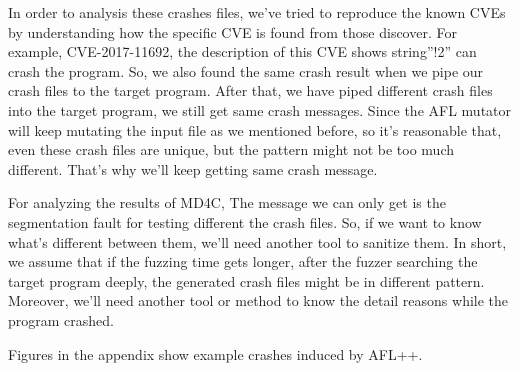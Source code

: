 \documentclass[12pt]{diazessay}
\begin{document}
In order to analysis these crashes files, we’ve tried to reproduce the known CVEs by understanding how the specific CVE is found from those discover.
For example, CVE-2017-11692, the description of this CVE shows string”!2” can crash the program.
So, we also found the same crash result when we pipe our crash files to the target program.
After that, we have piped different crash files into the target program, we still get same crash messages.
Since the AFL mutator will keep mutating the input file as we mentioned before, so it’s reasonable that, even these crash files are unique, but the pattern might not be too much different. That’s why we’ll keep getting same crash message.

For analyzing the results of MD4C, The message we can only get is the segmentation fault for testing different the crash files. So, if we want to know what’s different between them, we’ll need another tool to sanitize them.
In short, we assume that if the fuzzing time gets longer, after the fuzzer searching the target program deeply, the generated crash files might be in different pattern. Moreover, we’ll need another tool or method to know the detail reasons while the program crashed.

Figures in the appendix show example crashes induced by AFL++.
 
\end{document}

